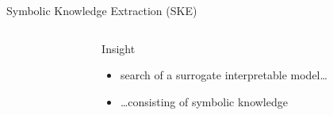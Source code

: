 \documentclass[presentation]{beamer}\mode<presentation>{\usetheme{AMSBolognaFC}}
\begin{document}
\begin{frame}[allowframebreaks]{Symbolic Knowledge Extraction (SKE)}
\begin{columns}
\begin{column}{0.19\linewidth}
        \end{column}
        \hfill
        \begin{column}{0.8\linewidth}
            \begin{block}{Insight}
                \begin{itemize}
                    \item search of a \alert{surrogate} interpretable model\ldots
                    \medskip
                    \item \ldots consisting of \alert{symbolic knowledge}
                \end{itemize}
            \end{block}
        \end{column}
    \end{columns}

    \framebreak


\end{frame}
\end{document}
